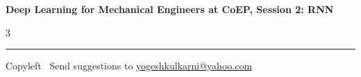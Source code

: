 \documentclass[8pt,landscape]{article}
\begin{document}
\footnotesize

\begin{center}
\Large{\textbf{Deep Learning for Mechanical Engineers at CoEP, Session 2: RNN}}
\end{center}

\begin{multicols}{3}

\end{multicols}

\rule{\linewidth}{0.25pt}
\scriptsize
Copyleft \textcopyleft\  Send suggestions to
\href{http://www.yogeshkulkarni.com}{yogeshkulkarni@yahoo.com}
\end{document}
